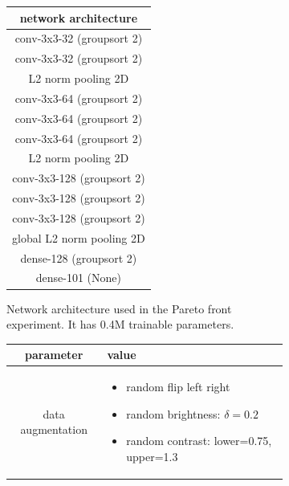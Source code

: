     \begin{figure}
        \begin{subfigure}[b]{0.35\textwidth}
                \small
                \centering
                \begin{tabular}{c}
                    \hline
                    network architecture \\
                    \hline
                    conv-3x3-32 (groupsort 2)\\
                    conv-3x3-32 (groupsort 2) \\
                    L2 norm pooling 2D \\
                    conv-3x3-64 (groupsort 2) \\
                    conv-3x3-64 (groupsort 2) \\ 
                    conv-3x3-64 (groupsort 2) \\ 
                    L2 norm pooling 2D \\
                    conv-3x3-128 (groupsort 2) \\
                    conv-3x3-128 (groupsort 2) \\
                    conv-3x3-128 (groupsort 2) \\ 
                    global L2 norm pooling 2D \\
                    dense-128 (groupsort 2) \\
                    dense-101 (None) \\
                    \hline
                \end{tabular}
                \caption{Network architecture used in the Pareto front experiment. It has 0.4M trainable parameters.}
                \label{fig:pareto-archi}
            \end{subfigure}
            \hfill
            \begin{subfigure}[b]{0.6\textwidth}
                \small
                \centering
                \begin{tabular}{cp{5.5cm}}
                    \hline
                    parameter & value \\
                    \hline
                    data augmentation & \begin{itemize}[leftmargin=*]
                        \item random flip left right
                        \item random brightness: $\delta=0.2$
                        \item random contrast: lower=0.75, upper=1.3

\end{itemize}
\end{tabular}
\end{subfigure}
\end{figure}
